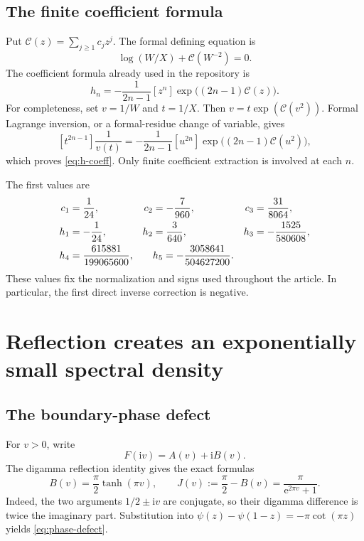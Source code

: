 \documentclass[11pt,a4paper]{article}
\theoremstyle{definition}
\numberwithin{equation}{section}
\newcommand{\ii}{\mathrm{i}}
\newcommand{\ee}{\mathrm{e}}
\newcommand{\cformal}{\mathcal C}
\begin{document}
\subsection{The finite coefficient formula}
Put $\cformal(z)=\sum_{j\ge1}c_jz^j$. The formal defining equation is
\begin{equation}
 \log(W/X)+\cformal(W^{-2})=0.
 \label{eq:formal-equation}
\end{equation}
The coefficient formula already used in the repository is
\begin{equation}
 h_n=-\frac1{2n-1}[z^n]\exp\bigl((2n-1)\cformal(z)\bigr).
 \label{eq:h-coeff}
\end{equation}
For completeness, set $v=1/W$ and $t=1/X$. Then
$v=t\exp(\cformal(v^2))$. Formal Lagrange inversion, or a formal-residue change of variable, gives
\[
 [t^{2n-1}]\frac1{v(t)}
 =-\frac1{2n-1}[u^{2n}]\exp\bigl((2n-1)\cformal(u^2)\bigr),
\]
which proves \eqref{eq:h-coeff}. Only finite coefficient extraction is involved at each $n$.

The first values are
\begin{align}
 c_1&=\frac1{24},&c_2&=-\frac7{960},&c_3&=\frac{31}{8064},\label{eq:c-first}\\
 h_1&=-\frac1{24},&h_2&=\frac3{640},&h_3&=-\frac{1525}{580608},\notag\\
 h_4&=\frac{615881}{199065600},&&h_5=-\frac{3058641}{504627200}.
 \label{eq:h-first}
\end{align}
These values fix the normalization and signs used throughout the article. In particular, the first direct inverse correction is negative.

\section{Reflection creates an exponentially small spectral density}
\label{sec:density}

\subsection{The boundary-phase defect}
For $v>0$, write
\begin{equation}
 F(\ii v)=A(v)+\ii B(v).
 \label{eq:AB}
\end{equation}
The digamma reflection identity \cite[\S5.5(ii)]{dlmf} gives the exact formulas
\begin{equation}
 B(v)=\frac\pi2\tanh(\pi v),\qquad
 J(v):=\frac\pi2-B(v)=\frac{\pi}{\ee^{2\pi v}+1}.
 \label{eq:phase-defect}
\end{equation}
Indeed, the two arguments $1/2\pm\ii v$ are conjugate, so their digamma difference is twice the imaginary part. Substitution into
$\psi(z)-\psi(1-z)=-\pi\cot(\pi z)$ yields \eqref{eq:phase-defect}.
\end{document}
